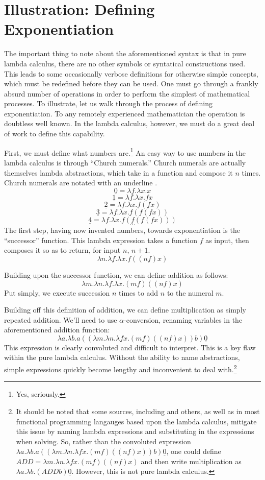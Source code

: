 \documentclass[twocolumn,titlepage,12pt]{article}
\begin{document}
\section{Illustration: Defining Exponentiation}
The important thing to note about the aforementioned syntax is that in pure lambda calculus, there are no other symbols or syntatical constructions used. This leads to some occasionally verbose definitions for otherwise simple concepts, which must be redefined before they can be used. One must go through a frankly absurd number of operations in order to perform the simplest of mathematical processes. To illustrate, let us walk through the process of defining exponentiation. To any remotely experienced mathematician the operation is doubtless well known. In the lambda calculus, however, we must do a great deal of work to define this capability.

First, we must define what numbers are.\footnote{Yes, seriously.} An easy way to use numbers in the lambda calculus is through ``Church numerals.'' Church numerals are actually themselves lambda abstractions, which take in a function and compose it $n$ times. Church numerals are notated with an underline \cite{cornelllc}.
$$\underline{0}=\lambda f.\lambda x.x$$
$$\underline{1}=\lambda f.\lambda x.fx$$
$$\underline{2}=\lambda f.\lambda x.f(fx)$$
$$\underline{3}=\lambda f.\lambda x.f(f(fx))$$
$$\underline{4}=\lambda f.\lambda x.f(f(f(fx)))$$
$$...$$
The first step, having now invented numbers, towards exponentiation is the ``successor'' function. This lambda expression takes a function $f$ as input, then composes it so as to return, for input $n$, $n+1$.
$$\lambda n.\lambda f.\lambda x.f((n f) x)$$

Building upon the successor function, we can define addition as follows:
$$\lambda m.\lambda n.\lambda f.\lambda x.(m f) ((n f) x)$$
Put simply, we execute succession $n$ times to add $n$ to the numeral $m$.

Building off this definition of addition, we can define multiplication as simply repeated addition. We'll need to use $\alpha$-conversion, renaming variables in the aforementioned addition function:
$$\lambda a.\lambda b.a ((\lambda m.\lambda n.\lambda fx.(m f) ((n f) x)) b) \underline{0}$$
This expression is clearly convoluted and difficult to interpret. This is a key flaw within the pure lambda calculus. Without the ability to name abstractions, simple expressions quickly become lengthy and inconvenient to deal with.\footnote{It should be noted that some sources, including \cite{cornelllc}\cite{rojastutorial} and others, as well as in most functional programming langauges based upon the lambda calculus, mitigate this issue by naming lambda expressions and substituting in the expressions when solving. So, rather than the convoluted expression $\lambda a.\lambda b.a ((\lambda m.\lambda n.\lambda fx.(m f) ((n f) x)) b) \underline{0}$, one could define $ADD=\lambda m.\lambda n.\lambda fx.(m f) ((n f) x)$ and then write multiplication as $\lambda a.\lambda b.(ADD b) \underline{0}$. However, this is not pure lambda calculus.}
\end{document}
